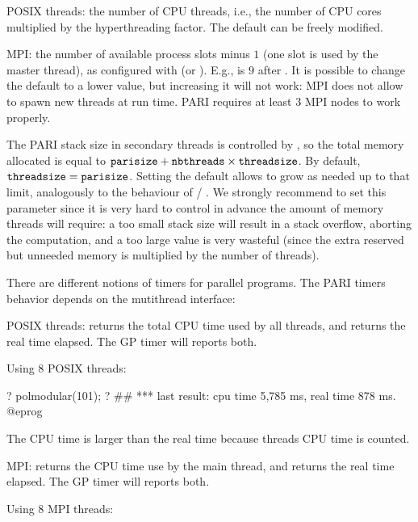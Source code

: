 \item POSIX threads: the number of CPU threads, i.e., the number of CPU cores
multiplied by the hyperthreading factor. The default can be freely modified.

\item MPI: the number of available process slots minus $1$ (one slot is used by
the master thread), as configured with  (or ). E.g.,
 is $9$ after .
It is possible to change the default to a lower value, but increasing it will
not work: MPI does not allow to spawn new threads at run time. PARI requires
at least $3$ MPI nodes to work properly.

The PARI stack size in secondary threads is controlled by
, so the total memory allocated is equal to
${\tt parisize}+{\tt nbthreads}\times{\tt threadsize}$.  By default,
${\tt threadsize}={\tt parisize}$. Setting the  default
allows  to grow as needed up to that limit, analogously to
the behaviour of  / . We strongly recommend
to set this parameter since it is very hard to control in advance the amount
of memory threads will require: a too small stack size will result in a
stack overflow, aborting the computation, and a too large value is
very wasteful (since the extra reserved but unneeded memory is multiplied by
the number of threads).


There are different notions of timers for parallel programs.
The PARI timers behavior depends on the mutithread interface:

\item POSIX threads:  returns the total CPU time used
by all threads, and  returns the real time elapsed.
The GP timer will reports both.

Using $8$ POSIX threads:

\bprog
? polmodular(101);
? ##
  ***   last result: cpu time 5,785 ms, real time 878 ms.
@eprog

The CPU time is larger than the real time because threads CPU time is counted.

\item MPI:  returns the CPU time use by the main thread,
and  returns the real time elapsed.
The GP timer will reports both.

Using $8$ MPI threads:

